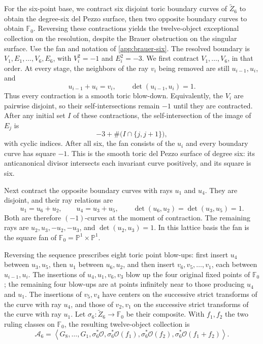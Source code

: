 \documentclass[11pt]{article}
\theoremstyle{plain}
\theoremstyle{definition}
\theoremstyle{remark}
\newcommand{\Pp}{\mathbb P}
\newcommand{\F}{\mathbb F}
\newcommand{\OO}{\mathcal O}
\begin{document}
For the six-point base, we contract six disjoint toric boundary curves of
\(\widetilde Z_6\) to obtain the degree-six del Pezzo surface, then two
opposite boundary curves to obtain \(\F_0\). Reversing these contractions
yields the twelve-object exceptional collection on the resolution,
despite the Brauer obstruction on the singular surface.
Use the fan and notation of \cref{app:brauer-six}. The resolved boundary is
\(V_1,E_1,\ldots,V_6,E_6\), with \(V_i^2=-1\) and \(E_i^2=-3\).
We first contract
\(V_1,\ldots,V_6\), in that order. At every stage, the neighbors
of the ray \(v_i\) being removed are still \(u_{i-1},u_i\), and
\[
u_{i-1}+u_i=v_i,\qquad \det(u_{i-1},u_i)=1.
\]
Thus every contraction is a smooth toric blow-down. Equivalently, the
\(V_i\) are pairwise disjoint, so their self-intersections remain
\(-1\) until they are contracted. After any initial set \(I\) of
these contractions, the self-intersection of the image of \(E_j\) is
\[
-3+\#\bigl(I\cap\{j,j+1\}\bigr),
\]
with cyclic indices. After all six, the fan consists of the \(u_i\)
and every boundary curve has square \(-1\). This is the smooth toric
del Pezzo surface of degree six: its anticanonical divisor intersects
each invariant curve positively, and its square is six.

Next contract the opposite boundary curves with rays \(u_1\) and
\(u_4\). They are disjoint, and their ray relations are
\[
u_1=u_6+u_2,\qquad u_4=u_3+u_5,
\qquad \det(u_6,u_2)=\det(u_3,u_5)=1.
\]
Both are therefore \((-1)\)-curves at the moment of contraction.
The remaining rays are \(u_2,u_3,-u_2,-u_3\), and
\(\det(u_2,u_3)=1\). In this lattice basis the fan is the square
fan of \(\F_0=\Pp^1\times\Pp^1\).

Reversing the sequence prescribes eight toric point blow-ups: first
insert \(u_4\) between \(u_3,u_5\), then \(u_1\) between
\(u_6,u_2\), and then insert \(v_6,v_5,\ldots,v_1\), each
between \(u_{i-1},u_i\). The insertions of \(u_4,u_1,v_6,v_3\)
blow up the four original fixed points of \(\F_0\); the remaining
four blow-ups are at points infinitely near to those producing \(u_4\)
and \(u_1\). The insertions of \(v_5,v_4\) have centers on the successive
strict transforms of the curve with ray \(u_4\), and those of \(v_2,v_1\)
on the successive strict transforms of the curve with ray \(u_1\).
Let
\(\sigma_6:\widetilde Z_6\to\F_0\) be their composite. With
\(f_1,f_2\) the two ruling classes on \(\F_0\), the resulting
twelve-object collection is
\[
\mathscr A_6=\left\langle G_8,\ldots,G_1,
\sigma_6^*\OO,\sigma_6^*\OO(f_1),\sigma_6^*\OO(f_2),
\sigma_6^*\OO(f_1+f_2)\right\rangle.
\]
\end{document}
